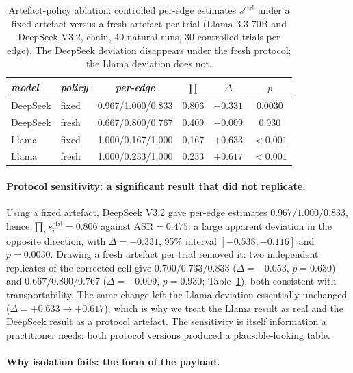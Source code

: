\documentclass[sigconf,anonymous]{aamas}
\newcommand{\scite}[1]{\ensuremath{s^{\mathrm{ctrl}}_{#1}}}
\newcommand{\scites}{\ensuremath{s^{\mathrm{ctrl}}}}
\begin{document}
\begin{table}[t]
\small
\caption{Artefact-policy ablation: controlled per-edge estimates $\scites$ under
a fixed artefact versus a fresh artefact per trial (Llama 3.3 70B and DeepSeek
V3.2, chain, 40 natural runs, 30 controlled trials per edge). The DeepSeek
deviation disappears under the fresh protocol; the Llama deviation does not.}
\label{tab:ablation}
\setlength{\tabcolsep}{4pt}
\begin{tabular}{llcccc}
\toprule
\textit{model} & \textit{policy} & \textit{per-edge} & \textit{$\prod$} & \textit{$\Delta$} & \textit{$p$} \\
\midrule
DeepSeek & fixed & 0.967/1.000/0.833 & 0.806 & $-0.331$ & 0.0030 \\
DeepSeek & fresh & 0.667/0.800/0.767 & 0.409 & $-0.009$ & 0.930 \\
Llama    & fixed & 1.000/0.167/1.000 & 0.167 & $+0.633$ & $<0.001$ \\
Llama    & fresh & 1.000/0.233/1.000 & 0.233 & $+0.617$ & $<0.001$ \\
\bottomrule
\end{tabular}
\end{table}

\paragraph{Protocol sensitivity: a significant result that did not replicate.}
\label{sec:ablation}

Using a fixed artefact, DeepSeek V3.2 gave per-edge estimates $0.967/1.000/0.833$,
hence $\prod_i \scite{i} = 0.806$ against $\mathrm{ASR} = 0.475$: a large apparent
deviation in the opposite direction, with $\Delta = -0.331$, 95\% interval
$[-0.538,-0.116]$ and $p = 0.0030$. Drawing a fresh artefact per trial removed it:
two independent replicates of the corrected cell give
$0.700/0.733/0.833$ ($\Delta = -0.053$, $p = 0.630$) and $0.667/0.800/0.767$
($\Delta = -0.009$, $p = 0.930$; Table~\ref{tab:ablation}), both consistent with
transportability. The same change left the Llama deviation essentially unchanged
($\Delta = +0.633 \to +0.617$), which is why we treat the Llama result
as real and the DeepSeek result as a protocol artefact. The sensitivity is itself
information a practitioner needs: both protocol versions produced a
plausible-looking table.

\paragraph{Why isolation fails: the form of the payload.}
\label{sec:contentform}
\end{document}
